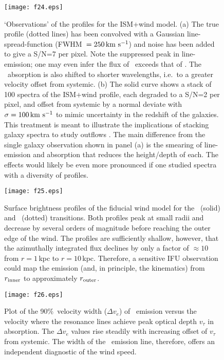 \documentclass[12pt,preprint]{aastex}
\begin{document}
\begin{figure}
\texttt{[image: f24.eps]}
\caption{
`Observations' of the  profiles for the ISM+wind model.  
(a) The true profile (dotted lines) has been convolved with a
Gaussian line-spread-function (FWHM~$= 250 \, {\rm km~s^{-1}}$) and noise has been
added to give a S/N=7 per pixel.  Note the suppressed peak in 
line-emission; one may even infer the flux of \mgiia\ exceeds that of
\mgiib.  The \mgiia\ absorption is also shifted to
shorter wavelengths, i.e.\ to a greater velocity offset from systemic.  
(b) The solid curve shows a stack of 100 spectra of the ISM+wind
profile, each degraded to a S/N=2 per pixel, and offset from systemic
by a normal deviate with $\sigma = 100 \, {\rm km~s^{-1}}$ to mimic uncertainty in
the redshift of the galaxies.  
This treatment is meant to illustrate the
implications of stacking galaxy spectra to study outflows
\citep[e.g.][S10]{wcp+09,rwk+10}.   The main difference from the
single galaxy observation shown in panel (a) is the smearing of
line-emission and absorption that reduces the height/depth of each.
The effects would likely be even more pronounced if one studied spectra with
a diversity of  profiles.    
}
\label{fig:obs_lris}
\end{figure}

\begin{figure}
\texttt{[image: f25.eps]}
\caption{
Surface brightness profiles of the fiducial wind model for the \mgiia\
(solid) and \feiie\ (dotted) transitions.  Both profiles peak at small
radii and decrease by several orders of magnitude before reaching the
outer edge of the wind.  The profiles are sufficiently shallow,
however, that the azimuthally integrated flux declines by only a
factor of $\approx 10$ from $r = 1$\,kpc to $r=10$\,kpc.  Therefore, a
sensitive IFU observation could map the emission (and, in principle,
the kinematics) from $r_{\rm inner}$ to approximately $r_{\rm outer}$.
}
\label{fig:obs_sb}
\end{figure}

\begin{figure}
\texttt{[image: f26.eps]}
\caption{
Plot of the 90\%\ velocity width ($\Delta v_e$) of \feiic\ emission versus the
velocity where the resonance lines achieve peak optical depth
$v_\tau$ in absorption.  The $\Delta v_e$ values rise steadily with
increasing offset of $v_\tau$ from systemic.  The width of the \feiic\
emission line, therefore, offers an independent diagnostic of the wind
speed.
}
\label{fig:obs_edelv}
\end{figure}
\end{document}
